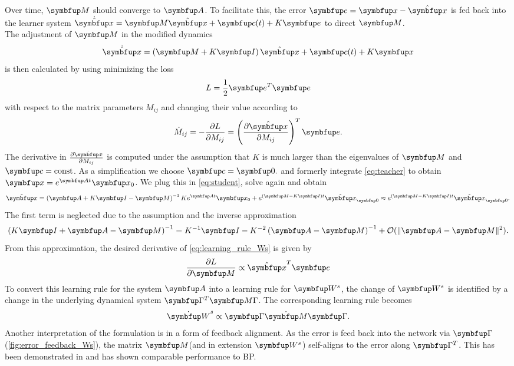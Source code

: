 Over time, $\bmu{M}$ should converge to $\bmu{A}$. To facilitate this, the error $\bmu{e} = \bmu{x} - \hat{\bmu{x}}$ is fed back into the learner system $\dot{\hat{\bmu{x}}} =\bmu{M}\hat{\bmu{x}} + \bmu{c}(t)  + K\bmu{e}$ to direct $\bmu{M}$.\\
The adjustment of $\bmu{M}$ in the modified dynamics
\begin{equation}\label{eq:student}
	\dot{\hat{\bmu{x}}} = \left(\bmu{M} + K\bmu{I}\right)\hat{\bmu{x}} + \bmu{c}(t) + K\bmu{x}
\end{equation}
is then calculated by using minimizing the loss
\begin{equation}
	L = \frac{1}{2}\bmu{e}^T\bmu{e}
\end{equation}
with respect to the matrix parameters $M_{ij}$ and changing their value according to
\begin{equation}\label{eq:learning_rule_Ws}
	\dot{M}_{ij} = -\frac{\partial L}{\partial M_{ij}} = \left(\frac{\partial \hat{\bmu{x}}}{\partial M_{ij}}\right)^T\bmu{e}.
\end{equation}
The derivative in $\frac{\partial \hat{\bmu{x}}}{\partial M_{ij}}$ is computed under the assumption that $K$ is much larger than the eigenvalues of $\bmu{M}$ and $\bmu{c} = \text{const}$. As a simplification we choose $\bmu{c} = \bmu{0}.$ and formerly integrate \cref{eq:teacher} to obtain $\bmu{x} = e^{\bmu{A}t}\bmu{x_0}$. We plug this in \cref{eq:student}, solve again and obtain
\begin{equation}\label{eq:hat_x_derivative}
	\hat{\bmu{x}} = \left(\bmu{A} + K\bmu{I} - \bmu{M}\right)^{-1}K e^{\bmu{A}t}\bmu{x_0} + e^{\left(\bmu{M}- K\bmu{I}\right)t}\hat{\bmu{x}}_{\bmu{0}}  \approx e^{\left(\bmu{M}- K\bmu{I}\right)t}\hat{\bmu{x}}_{\bmu{0}}.
\end{equation}
The first term is neglected due to the assumption and the inverse approximation
\begin{equation}
	\left(K\bmu{I} + \bmu{A} - \bmu{M}\right)^{-1}  = K^{-1}\bmu{I} - K^{-2}\left(\bmu{A} - \bmu{M}\right)^{-1} + \mathcal{O}(\|\bmu{A - \bmu{M}}\|^2).
\end{equation}
From this approximation, the desired derivative of \cref{eq:learning_rule_Ws} is given by
\begin{equation}
	\frac{\partial L}{\partial \bmu{M}}\propto \hat{\bmu{x}}^T\bmu{e}
\end{equation}
To convert this learning rule for the system $\bmu{A}$ into a learning rule for $\bmu{W}^s$, the change of $\bmu{W}^s$ is identified by a change in the underlying dynamical system $\bmu{\Gamma}^T \bmu{M \Gamma}$. The corresponding learning rule becomes
\begin{equation}
	\dot{\bmu{W}}^s \propto \bmu{\Gamma}\dot{\bmu{M}}\bmu{\Gamma}.
\end{equation}
Another interpretation of the formulation is in a form of feedback alignment. As the error is feed back into the network via $\bmu{\Gamma}$ (\cref{fig:error_feedback_Ws}), the matrix $\bmu{M}$(and in extension $\bmu{W}^s$) self-aligns to the error along $\bmu{\Gamma}^T$.
This has been demonstrated in \cite{lillicrap_random_2016} and has shown comparable performance to \ac{BP}.